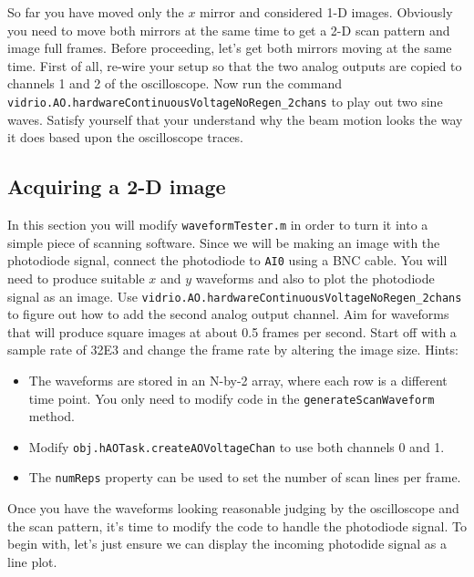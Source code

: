 \documentclass[a4paper]{report}
\begin{document}
So far you have moved only the $x$ mirror and considered 1-D images. 
Obviously you need to move both mirrors at the same time to get a 2-D scan pattern and image full frames.
Before proceeding, let's get both mirrors moving at the same time. 
First of all, re-wire your setup so that the two analog outputs are copied to channels 1 and 2 of the oscilloscope.
Now run the command \texttt{vidrio.AO.hardwareContinuousVoltageNoRegen\_2chans} to play out two sine waves.
Satisfy yourself that your understand why the beam motion looks the way it does based upon the oscilloscope traces.


\subsection{Acquiring a 2-D image}

In this section you will modify \texttt{waveformTester.m} in order to turn it into a simple piece of scanning software.
Since we will be making an image with the photodiode signal, connect the photodiode to \texttt{AI0} using a BNC cable.
You will need to produce suitable $x$ and $y$ waveforms and also to plot the photodiode signal as an image. 
Use \texttt{vidrio.AO.hardwareContinuousVoltageNoRegen\_2chans} to figure out how to add the second analog output channel.
Aim for waveforms that will produce square images at about 0.5 frames per second. 
Start off with a sample rate of 32E3 and change the frame rate by altering the image size.
Hints:
\begin{itemize}
    \setlength\itemsep{0.15em}
    \item The waveforms are stored in an N-by-2 array, where each row is a different time point. You only need to modify code in the \texttt{generateScanWaveform} method.
    \item Modify \texttt{obj.hAOTask.createAOVoltageChan} to use both channels 0 and 1.
    \item The \texttt{numReps} property can be used to set the number of scan lines per frame.
\end{itemize}

\noindent

Once you have the waveforms looking reasonable judging by the oscilloscope and the scan pattern, it's time to modify the code to handle the photodiode signal. 
To begin with, let's just ensure we can display the incoming photodide signal as a line plot.
\end{document}

